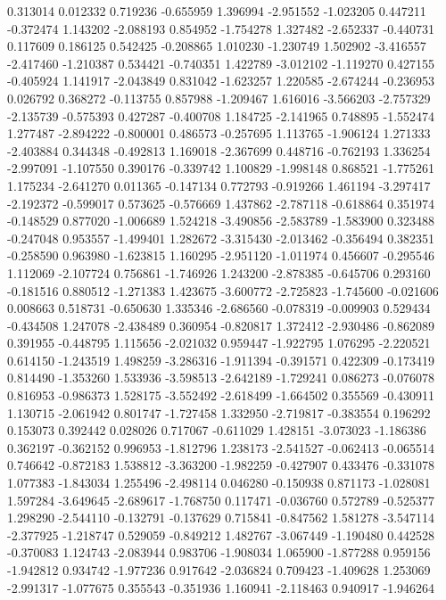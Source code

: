 0.313014
0.012332
0.719236
-0.655959
1.396994
-2.951552
-1.023205
0.447211
-0.372474
1.143202
-2.088193
0.854952
-1.754278
1.327482
-2.652337
-0.440731
0.117609
0.186125
0.542425
-0.208865
1.010230
-1.230749
1.502902
-3.416557
-2.417460
-1.210387
0.534421
-0.740351
1.422789
-3.012102
-1.119270
0.427155
-0.405924
1.141917
-2.043849
0.831042
-1.623257
1.220585
-2.674244
-0.236953
0.026792
0.368272
-0.113755
0.857988
-1.209467
1.616016
-3.566203
-2.757329
-2.135739
-0.575393
0.427287
-0.400708
1.184725
-2.141965
0.748895
-1.552474
1.277487
-2.894222
-0.800001
0.486573
-0.257695
1.113765
-1.906124
1.271333
-2.403884
0.344348
-0.492813
1.169018
-2.367699
0.448716
-0.762193
1.336254
-2.997091
-1.107550
0.390176
-0.339742
1.100829
-1.998148
0.868521
-1.775261
1.175234
-2.641270
0.011365
-0.147134
0.772793
-0.919266
1.461194
-3.297417
-2.192372
-0.599017
0.573625
-0.576669
1.437862
-2.787118
-0.618864
0.351974
-0.148529
0.877020
-1.006689
1.524218
-3.490856
-2.583789
-1.583900
0.323488
-0.247048
0.953557
-1.499401
1.282672
-3.315430
-2.013462
-0.356494
0.382351
-0.258590
0.963980
-1.623815
1.160295
-2.951120
-1.011974
0.456607
-0.295546
1.112069
-2.107724
0.756861
-1.746926
1.243200
-2.878385
-0.645706
0.293160
-0.181516
0.880512
-1.271383
1.423675
-3.600772
-2.725823
-1.745600
-0.021606
0.008663
0.518731
-0.650630
1.335346
-2.686560
-0.078319
-0.009903
0.529434
-0.434508
1.247078
-2.438489
0.360954
-0.820817
1.372412
-2.930486
-0.862089
0.391955
-0.448795
1.115656
-2.021032
0.959447
-1.922795
1.076295
-2.220521
0.614150
-1.243519
1.498259
-3.286316
-1.911394
-0.391571
0.422309
-0.173419
0.814490
-1.353260
1.533936
-3.598513
-2.642189
-1.729241
0.086273
-0.076078
0.816953
-0.986373
1.528175
-3.552492
-2.618499
-1.664502
0.355569
-0.430911
1.130715
-2.061942
0.801747
-1.727458
1.332950
-2.719817
-0.383554
0.196292
0.153073
0.392442
0.028026
0.717067
-0.611029
1.428151
-3.073023
-1.186386
0.362197
-0.362152
0.996953
-1.812796
1.238173
-2.541527
-0.062413
-0.065514
0.746642
-0.872183
1.538812
-3.363200
-1.982259
-0.427907
0.433476
-0.331078
1.077383
-1.843034
1.255496
-2.498114
0.046280
-0.150938
0.871173
-1.028081
1.597284
-3.649645
-2.689617
-1.768750
0.117471
-0.036760
0.572789
-0.525377
1.298290
-2.544110
-0.132791
-0.137629
0.715841
-0.847562
1.581278
-3.547114
-2.377925
-1.218747
0.529059
-0.849212
1.482767
-3.067449
-1.190480
0.442528
-0.370083
1.124743
-2.083944
0.983706
-1.908034
1.065900
-1.877288
0.959156
-1.942812
0.934742
-1.977236
0.917642
-2.036824
0.709423
-1.409628
1.253069
-2.991317
-1.077675
0.355543
-0.351936
1.160941
-2.118463
0.940917
-1.946264
